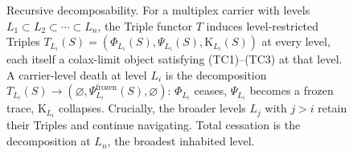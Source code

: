 
\begin{figure}[htbp]
\centering
{}
\caption{Recursive decomposability. For a multiplex carrier with levels $L_1 \subset L_2 \subset \cdots \subset L_n$, the Triple functor $T$ induces level-restricted Triples $T_{L_i}(S) = (\Phi_{L_i}(S), \Psi_{L_i}(S), \mathrm{K}_{L_i}(S))$ at every level, each itself a colax-limit object satisfying (TC1)–(TC3) at that level. A carrier-level death at level $L_i$ is the decomposition $T_{L_i}(S) \to (\varnothing, \Psi_{L_i}^{\mathrm{frozen}}(S), \varnothing)$: $\Phi_{L_i}$ ceases, $\Psi_{L_i}$ becomes a frozen trace, $\mathrm{K}_{L_i}$ collapses. Crucially, the broader levels $L_j$ with $j > i$ retain their Triples and continue navigating. Total cessation is the decomposition at $L_n$, the broadest inhabited level.}
\label{fig:recursive-decomposition}
\end{figure}
